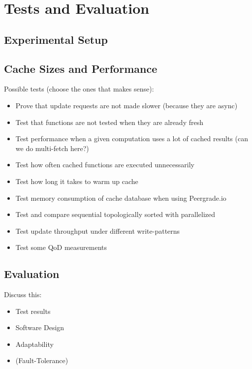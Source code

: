 \chapter{Tests and Evaluation}
\label{chapter:tests-and-evaluation}

\section{Experimental Setup}
\label{sec:experimental-setup}


\section{Cache Sizes and Performance}
\label{sec:cache-sizes-and-performance}

Possible tests (choose the ones that makes sense):

\begin{itemize}
  \item Prove that update requests are not made slower (because they are async)
  \item Test that functions are not tested when they are already fresh
  \item Test performance when a given computation uses a lot of cached results (can we do multi-fetch here?)
  \item Test how often cached functions are executed unnecessarily
  \item Test how long it takes to warm up cache
  \item Test memory consumption of cache database when using Peergrade.io
  \item Test and compare sequential topologically sorted with parallelized
  \item Test update throughput under different write-patterns
  \item Test some QoD measurements
\end{itemize}


\section{Evaluation}
\label{sec:evaluation}

Discuss this:

\begin{itemize}
  \item Test results
  \item Software Design
  \item Adaptability
  \item (Fault-Tolerance)
\end{itemize}





